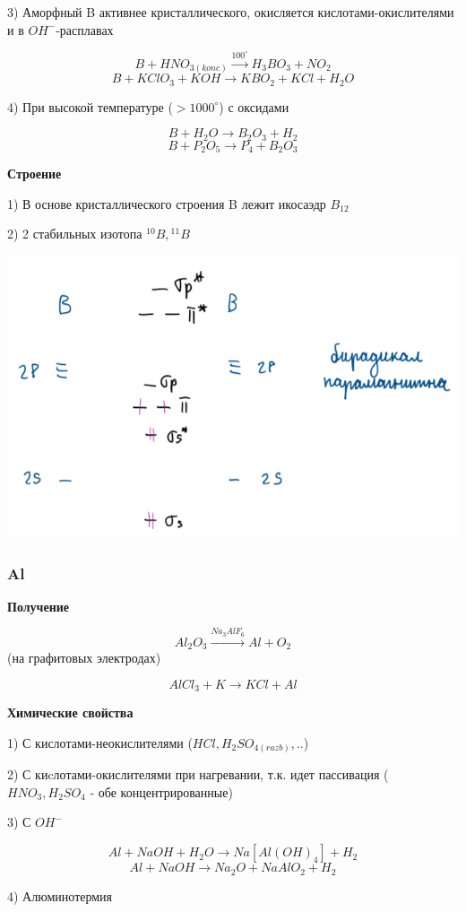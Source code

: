 \documentclass[14pt,a4paper]{scrartcl}
\begin{document}
3) Аморфный B активнее кристаллического, окисляется кислотами-окислителями и в $OH^-$-расплавах

$$B + HNO_{3(konc)} \xrightarrow{100^{\circ}} H_3BO_3 + NO_2$$
$$B + KClO_3 + KOH \rightarrow KBO_2 + KCl + H_2O$$

4) При высокой температуре ($>1000^{\circ}$) с оксидами

$$B + H_2O \rightarrow B_2O_3 +H_2$$
$$B + P_2O_5 \rightarrow P_4 + B_2O_3$$

\textbf{Строение}

1) В основе кристаллического строения B лежит икосаэдр $B_{12}$

2) 2 стабильных изотопа ${^{10}B}, {^{11}B}$

\includegraphics{11v1.png}

\subsubsection{Al}

\textbf{Получение}

$$Al_2O_3 \xrightarrow{Na_3AlF_6} Al + O_2$$
(на графитовых электродах)

$$AlCl_3 + K \rightarrow KCl + Al$$

\textbf{Химические свойства}

1) С кислотами-неокислителями ($HCl, H_2SO_{4(razb)},..$)

2) С киcлотами-окислителями при нагревании, т.к. идет пассивация
($HNO_3, H_2SO_4$ - обе концентрированные)

3) С $OH^-$

$$Al + NaOH + H_2O \rightarrow Na[Al(OH)_4] + H_2$$
$$Al + NaOH \rightarrow Na_2O + NaAlO_2 +H_2$$

4) Алюминотермия
\end{document}
